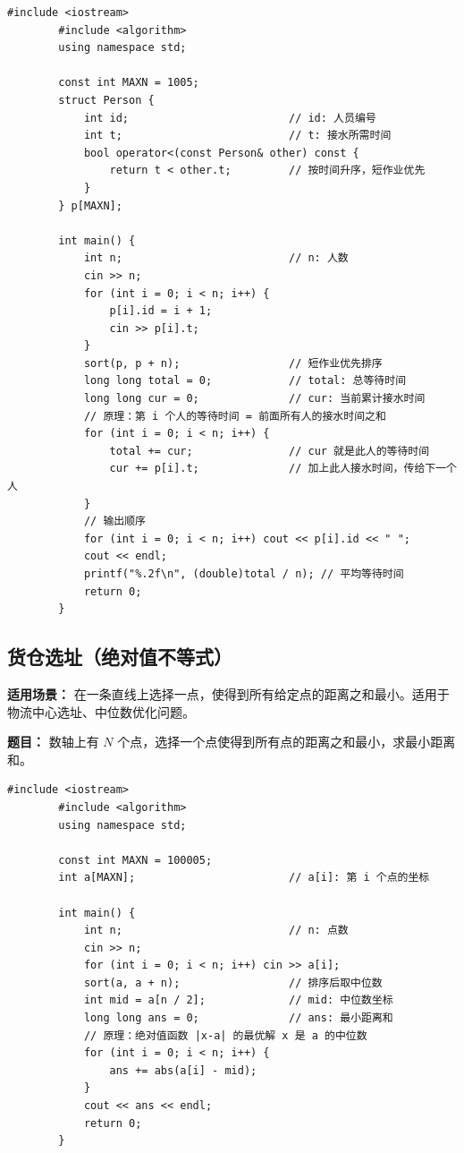\documentclass[12pt,a4paper]{ctexart}
\begin{document}
	\begin{lstlisting}[caption={贪心——按服务时间升序排队，短作业优先}]
		#include <iostream>
		#include <algorithm>
		using namespace std;
		
		const int MAXN = 1005;
		struct Person {
			int id;                         // id: 人员编号
			int t;                          // t: 接水所需时间
			bool operator<(const Person& other) const {
				return t < other.t;         // 按时间升序，短作业优先
			}
		} p[MAXN];
		
		int main() {
			int n;                          // n: 人数
			cin >> n;
			for (int i = 0; i < n; i++) {
				p[i].id = i + 1;
				cin >> p[i].t;
			}
			sort(p, p + n);                 // 短作业优先排序
			long long total = 0;            // total: 总等待时间
			long long cur = 0;              // cur: 当前累计接水时间
			// 原理：第 i 个人的等待时间 = 前面所有人的接水时间之和
			for (int i = 0; i < n; i++) {
				total += cur;               // cur 就是此人的等待时间
				cur += p[i].t;              // 加上此人接水时间，传给下一个人
			}
			// 输出顺序
			for (int i = 0; i < n; i++) cout << p[i].id << " ";
			cout << endl;
			printf("%.2f\n", (double)total / n); // 平均等待时间
			return 0;
		}
	\end{lstlisting}
	
	\subsection{货仓选址（绝对值不等式）}
	\textbf{适用场景：} 在一条直线上选择一点，使得到所有给定点的距离之和最小。适用于物流中心选址、中位数优化问题。
	
	\textbf{题目：} 数轴上有 $N$ 个点，选择一个点使得到所有点的距离之和最小，求最小距离和。
	
	\begin{lstlisting}[caption={贪心——选中位数，利用绝对值不等式}]
		#include <iostream>
		#include <algorithm>
		using namespace std;
		
		const int MAXN = 100005;
		int a[MAXN];                        // a[i]: 第 i 个点的坐标
		
		int main() {
			int n;                          // n: 点数
			cin >> n;
			for (int i = 0; i < n; i++) cin >> a[i];
			sort(a, a + n);                 // 排序后取中位数
			int mid = a[n / 2];             // mid: 中位数坐标
			long long ans = 0;              // ans: 最小距离和
			// 原理：绝对值函数 |x-a| 的最优解 x 是 a 的中位数
			for (int i = 0; i < n; i++) {
				ans += abs(a[i] - mid);
			}
			cout << ans << endl;
			return 0;
		}
	\end{lstlisting}
	
\end{document}
